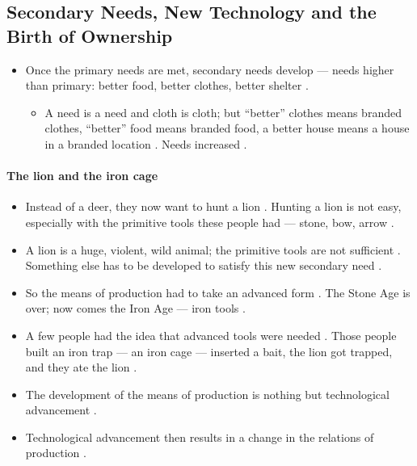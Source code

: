 \subsection{Secondary Needs, New Technology and the Birth of Ownership}
\begin{itemize}
    \item Once the primary needs are met, secondary needs develop --- needs higher than primary: better food, better clothes, better shelter .
    \begin{itemize}
        \item A need is a need and cloth is cloth; but ``better'' clothes means branded clothes, ``better'' food means branded food, a better house means a house in a branded location . Needs increased .
    \end{itemize}
\end{itemize}

\paragraph{The lion and the iron cage}
\begin{itemize}
    \item Instead of a deer, they now want to hunt a lion . Hunting a lion is not easy, especially with the primitive tools these people had --- stone, bow, arrow .
    \item A lion is a huge, violent, wild animal; the primitive tools are not sufficient . Something else has to be developed to satisfy this new secondary need .
    \item So the means of production had to take an advanced form . The Stone Age is over; now comes the Iron Age --- iron tools .
    \item A few people had the idea that advanced tools were needed . Those people built an iron trap --- an iron cage --- inserted a bait, the lion got trapped, and they ate the lion .
\end{itemize}

\begin{KeyConcept}
\begin{itemize}
    \item The development of the means of production is nothing but technological advancement .
    \item Technological advancement then results in a change in the relations of production .
\end{itemize}
\end{KeyConcept}

